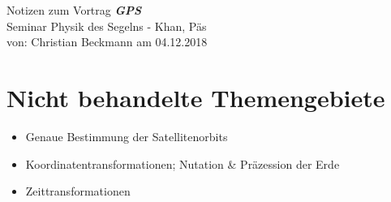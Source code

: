 
\newcommand{\ch}{$\checkmark$}

    {\huge Notizen zum Vortrag \textit{\textbf{GPS}}}\\
    Seminar Physik des Segelns - Khan, Päs \\
    von: Christian Beckmann am 04.12.2018
    \tableofcontents
    \newpage
    
    
    
    
    
    
    \newpage
    
    \section{Nicht behandelte Themengebiete}
    \begin{itemize}
        \item Genaue Bestimmung der Satellitenorbits
        \item Koordinatentransformationen; Nutation \& Präzession der Erde
        \item Zeittransformationen
    \end{itemize}
    \nocite{*}
    \printbibliography

